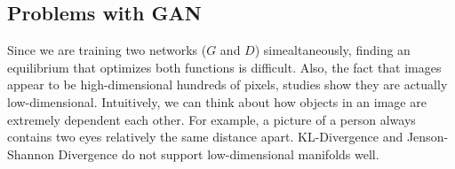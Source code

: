 \subsection{Problems with GAN}
Since we are training two networks ($G$ and $D$) simealtaneously, finding an equilibrium that optimizes both functions is difficult. Also, the fact that images appear to be high-dimensional hundreds of pixels, studies show they are actually low-dimensional. Intuitively, we can think about how objects in an image are extremely dependent each other. For example, a picture of a person always contains two eyes relatively the same distance apart. KL-Divergence and Jenson-Shannon Divergence do not support low-dimensional manifolds well. 
